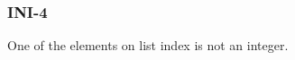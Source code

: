 \subsubsection{INI-4}\label{sec:error_code_ini_4}

One of the elements on list index is not an integer.



